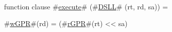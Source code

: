 function clause #\hyperref[zexecute]{execute}# (#\hyperref[zDSLL]{DSLL}# (rt, rd, sa)) =
  {

    #\hyperref[zwGPR]{wGPR}#(rd) = (#\hyperref[zrGPR]{rGPR}#(rt) << sa)
  }
